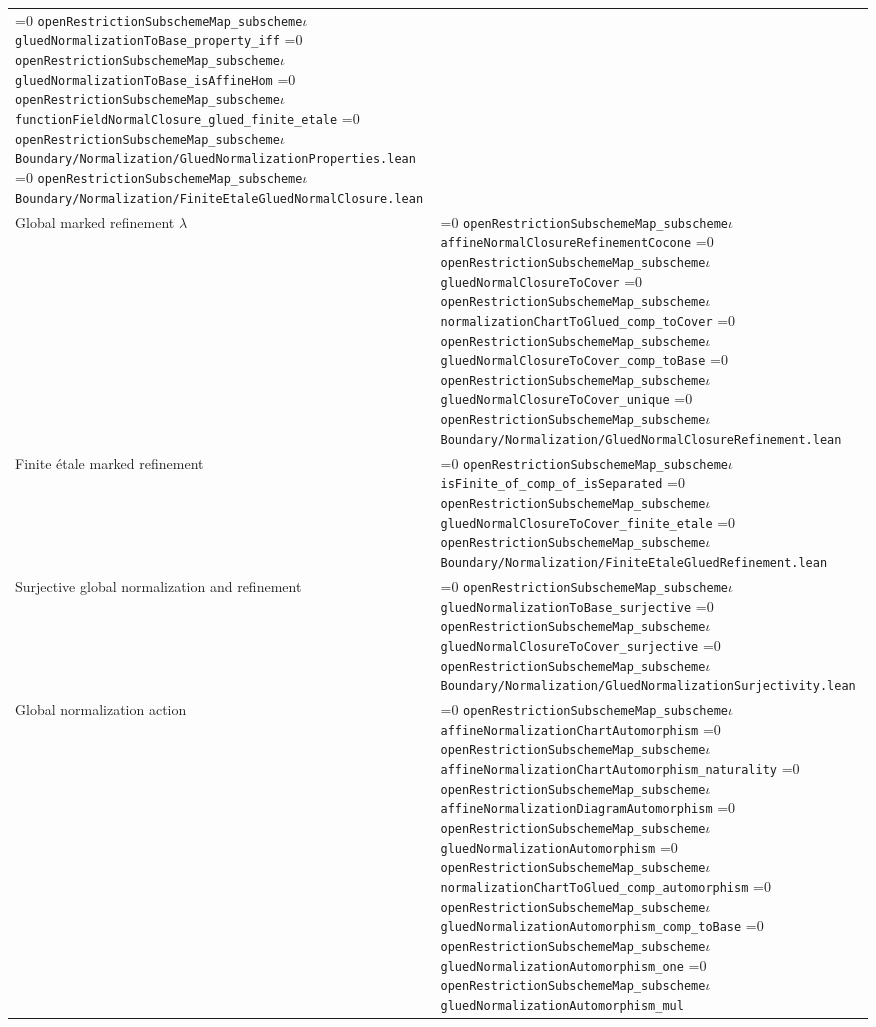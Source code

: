 \documentclass[11pt]{article}
\theoremstyle{definition}
\theoremstyle{remark}
\newcommand{\leanpath}[1]{%
  \ifnum\pdfstrcmp{\detokenize{#1}}%
      {\detokenize{openRestrictionSubschemeMap_subschemeι}}=0
    \texttt{\nolinkurl{openRestrictionSubschemeMap_subscheme}}\ensuremath{\iota}%
  \else
    \texttt{\nolinkurl{#1}}%
  \fi}
\begin{document}
\begin{longtable}{@{}>{\raggedright\arraybackslash}p{}
                >{\raggedright\arraybackslash}p{}@{}}
\leanpath{gluedNormalizationToBase_property_iff}\newline
\leanpath{gluedNormalizationToBase_isAffineHom}\newline
\leanpath{functionFieldNormalClosure_glued_finite_etale}\newline
\leanpath{Boundary/Normalization/GluedNormalizationProperties.lean}\newline
\leanpath{Boundary/Normalization/FiniteEtaleGluedNormalClosure.lean}\\
Global marked refinement \(\lambda\) &
\leanpath{affineNormalClosureRefinementCocone}\newline
\leanpath{gluedNormalClosureToCover}\newline
\leanpath{normalizationChartToGlued_comp_toCover}\newline
\leanpath{gluedNormalClosureToCover_comp_toBase}\newline
\leanpath{gluedNormalClosureToCover_unique}\newline
\leanpath{Boundary/Normalization/GluedNormalClosureRefinement.lean}\\
Finite \'{e}tale marked refinement &
\leanpath{isFinite_of_comp_of_isSeparated}\newline
\leanpath{gluedNormalClosureToCover_finite_etale}\newline
\leanpath{Boundary/Normalization/FiniteEtaleGluedRefinement.lean}\\
Surjective global normalization and refinement &
\leanpath{gluedNormalizationToBase_surjective}\newline
\leanpath{gluedNormalClosureToCover_surjective}\newline
\leanpath{Boundary/Normalization/GluedNormalizationSurjectivity.lean}\\
Global normalization action &
\leanpath{affineNormalizationChartAutomorphism}\newline
\leanpath{affineNormalizationChartAutomorphism_naturality}\newline
\leanpath{affineNormalizationDiagramAutomorphism}\newline
\leanpath{gluedNormalizationAutomorphism}\newline
\leanpath{normalizationChartToGlued_comp_automorphism}\newline
\leanpath{gluedNormalizationAutomorphism_comp_toBase}\newline
\leanpath{gluedNormalizationAutomorphism_one}\newline
\leanpath{gluedNormalizationAutomorphism_mul}\newline

\end{longtable}
\end{document}
